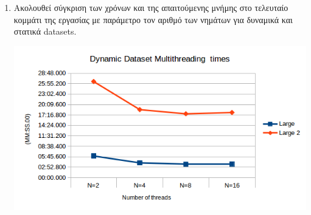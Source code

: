 \documentclass[11pt]{article}
\begin{document}
\begin{enumerate}
\item Aκολουθεί σύγκριση των χρόνων και της απαιτούμενης μνήμης στο τελευταίο κομμάτι της εργασίας με παράμετρο τον αριθμό των νημάτων για δυναμικά και στατικά datasets.\\
\begin{table}[H]
\caption{Dynamic Dataset Multithreading times}
\begin{minipage}{.5\textwidth}
\centering
\footnotesize
\tabcolsep=0.11cm
\label{ddmt}
\end{minipage}%
\begin{minipage}{.5\textwidth}
\includegraphics[scale=0.5]{DynamicDatasetMultithreading_times.png}
\end{minipage}%
\end{table}


\end{enumerate}
\end{document}
